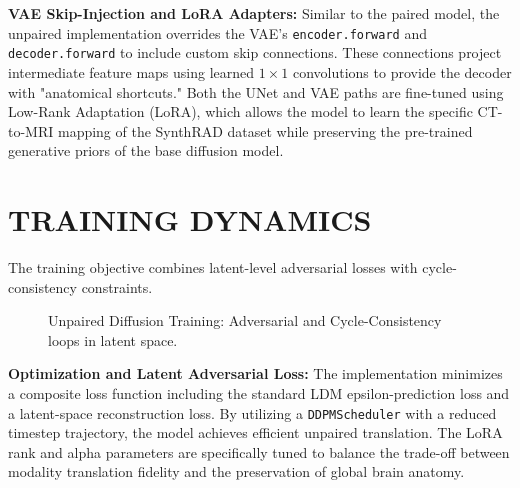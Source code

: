 \documentclass[10pt,a4paper]{article}
\begin{document}
\textbf{VAE Skip-Injection and LoRA Adapters:} 
Similar to the paired model, the unpaired implementation overrides the VAE's \texttt{encoder.forward} and \texttt{decoder.forward} to include custom skip connections. These connections project intermediate feature maps using learned $1 \times 1$ convolutions to provide the decoder with "anatomical shortcuts." Both the UNet and VAE paths are fine-tuned using Low-Rank Adaptation (LoRA), which allows the model to learn the specific CT-to-MRI mapping of the SynthRAD dataset while preserving the pre-trained generative priors of the base diffusion model.

\section{TRAINING DYNAMICS}
The training objective combines latent-level adversarial losses with cycle-consistency constraints.

\begin{figure}[H]
\centering
{}
\caption{Unpaired Diffusion Training: Adversarial and Cycle-Consistency loops in latent space.}
\end{figure}

\textbf{Optimization and Latent Adversarial Loss:} 
The implementation minimizes a composite loss function including the standard LDM epsilon-prediction loss and a latent-space reconstruction loss. By utilizing a \texttt{DDPMScheduler} with a reduced timestep trajectory, the model achieves efficient unpaired translation. The LoRA rank and alpha parameters are specifically tuned to balance the trade-off between modality translation fidelity and the preservation of global brain anatomy.
\end{document}
